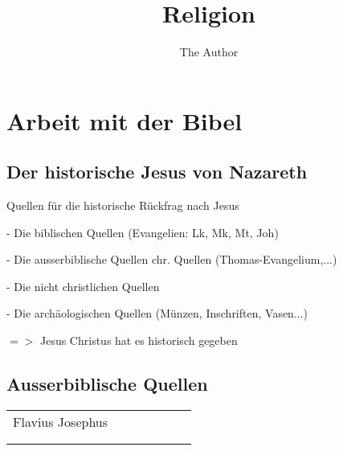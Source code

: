 \documentclass[11pt, oneside]{article}   	%
\title{Religion}
\author{The Author}
\begin{document}
\maketitle
\pagebreak

\section{Arbeit mit der Bibel}
\subsection{Der historische Jesus von Nazareth}

Quellen f\"ur die historische R\"uckfrag nach Jesus

\vspace{0.5cm}

- Die biblischen Quellen (Evangelien: Lk, Mk, Mt, Joh)

- Die ausserbiblische Quellen chr. Quellen (Thomas-Evangelium,...)

- Die nicht christlichen Quellen

- Die arch\"aologischen Quellen (M\"unzen, Inschriften, Vasen...)

$=>$ Jesus Christus hat es historisch gegeben


\pagebreak

\subsection{Ausserbiblische Quellen}

\begin{tabular}{|l|l|l|l|l|l|l|}
\cline{1-2}
      Flavius Josephus &  \\ \cline{1-2}
 &  \\ \cline{1-2}
&  \\ \cline{1-2}


\end{tabular}

\pagebreak
\end{document}
